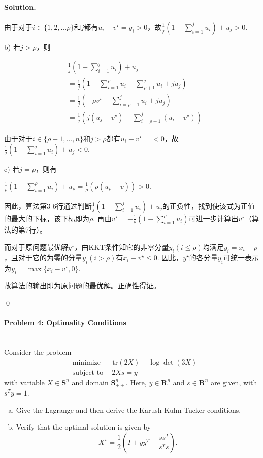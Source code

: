 \documentclass[a4paper]{article}
\newenvironment{solution}
{\color{blue} \paragraph{Solution.}}
{\newline \qed}
\begin{document}
\begin{solution}
        由于对于$i\in \{1, 2, ...\rho\}$和$j$都有$u_i-v^\star=y_i>0$，故$\frac 1j(1-\sum_{i=1}^ju_i)+u_j>0$.

    b) 若$j>\rho$，则

    \begin{equation}
        \begin{split}
            &\frac 1j(1-\sum_{i=1}^ju_i)+u_j\\
            &=\frac 1j(1-\sum_{i=1}^\rho u_i-\sum_{\rho+1}^j u_i+ju_j)\\
            &=\frac 1j(-\rho v^\star-\sum_{i=\rho+1}^j u_i+ju_j)\\
            &=\frac 1j(j(u_j-v^\star)-\sum_{i=\rho+1}^j(u_i-v^\star))
        \end{split}
    \end{equation}
    
    由于对于$i\in \{\rho+1, ...,n\}$和$j>\rho$都有$u_i-v^\star=<0$，故$\frac 1j(1-\sum_{i=1}^ju_i)+u_j<0$.

    c) 若$j=\rho$，则有
        
    $\frac 1\rho(1-\sum_{i=1}^\rho u_i)+u_{\rho}=\frac 1\rho(\rho(u_\rho-v))>0$.

    因此，算法第3-6行通过判断$\frac 1j(1-\sum_{i=1}^ju_i)+u_j$的正负性，找到使该式为正值的最大的下标，该下标即为$\rho$. 再由$v^\star=-\frac 1\rho (1-\sum_{i=1}^\rho u_i)$可进一步计算出$v^\star$（算法的第7行）。

    而对于原问题最优解$y^\star$，由KKT条件知它的非零分量$y_i(i\leq\rho)$均满足$y_i=x_i-\rho$，且对于它的为零的分量$y_i(i>\rho)$有$x_i-v^\star\leq 0$. 因此，$y^\star$的各分量$y_i$可统一表示为$y_i=\max\{x_i-v^\star, 0\}$.

    故算法的输出即为原问题的最优解。正确性得证。

\end{solution}

\paragraph{Problem 4: Optimality Conditions}
~\\
Consider the problem
\begin{equation*}
    \begin{split}
        &\text{minimize~~} \quad  \text{tr}(2X) - \log{\det{(3X)}} \\
        &\text{subject to} \quad~  2Xs=y
    \end{split}
\end{equation*}
with variable $X \in \mathbf{S}^n$ and domain $\mathbf{S}_{++}^n$. Here, $y \in \mathbf{R}^n$ and $s \in \mathbf{R}^n$ are given, with $s^T y =1$.
\begin{enumerate}[a)]
    \item Give the Lagrange and then derive the Karush-Kuhn-Tucker conditions.
    \item Verify that the optimal solution is given by
    \begin{equation*}
        X^\star = \frac{1}{2} \left(I + yy^T - \frac{ss^T}{s^T s}\right) .
    \end{equation*}
\end{enumerate}
\end{document}

